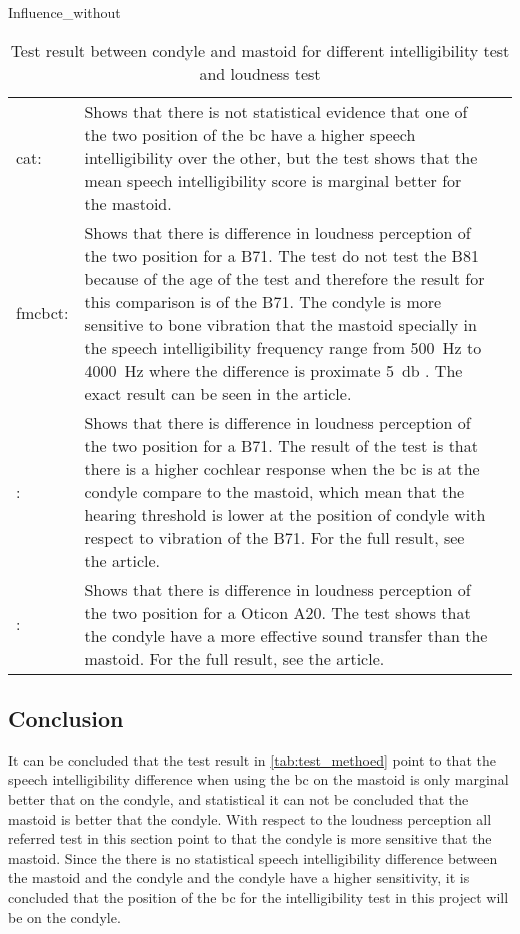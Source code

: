 Influence_without
 
\begin{table}[H]
\begin{tabularx}{\textwidth}{l X l}
\hline
\gls{cat}: & Shows that there is not statistical evidence that one of the two position of the \gls{bc} have a higher speech intelligibility over the other, but the test shows that the mean speech intelligibility score is marginal better for the mastoid. \\
\gls{fmcbct}: & Shows that there is difference in loudness perception of the two position for a B71. The test do not test the B81 because of the age of the test and therefore the result for this comparison is of the B71. The condyle is more sensitive to bone vibration that the mastoid specially in the speech intelligibility frequency range from \SI{500}{\hertz} to \SI{4000}{\hertz} where the difference is proximate \SI{5}{\decibel} \citep{freefield_method}. The exact result can be seen in the article. \\
\citep{Influence_without}: & Shows that there is difference in loudness perception of the two position for a B71. The result of the test is that there is a higher cochlear response when the \gls{bc} is at the condyle compare to the mastoid, which mean that the hearing threshold is lower at the position of condyle \citep{Influence_without} with respect to vibration of the B71. For the full result, see the article. \\
\citep{sensitivity_mapping}: & Shows that there is difference in loudness perception of the two position for a Oticon A20. The test shows that the condyle have a more effective sound transfer than the mastoid. For the full result, see the article.  \\ \hline
\end{tabularx}
\caption{Test result between condyle and mastoid for different intelligibility test and loudness test} 
\label{tab:test_methoed}
\end{table}



\subsection{Conclusion}
It can be concluded that the test result in \autoref{tab:test_methoed} point to that the speech intelligibility difference when using the \gls{bc} on the mastoid is only marginal better that on the condyle, and statistical it can not be concluded that the mastoid is better that the condyle. With respect to the loudness perception all referred test in this section point to that the condyle is more sensitive that the mastoid. Since the there is no statistical speech intelligibility difference between the mastoid and the condyle and the condyle have a higher sensitivity, it is concluded that the position of the \gls{bc} for the intelligibility test in this project will be on the condyle.


